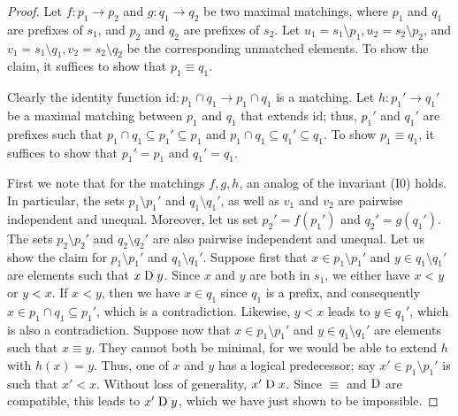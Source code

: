 \begin{proof}
  Let $f\colon p_1 \to p_2$ and $g\colon q_1 \to q_2$
  be two maximal matchings, where $p_1$ and $q_1$ are prefixes of $s_1$, and
  $p_2$ and $q_2$ are prefixes of $s_2$. Let $u_1=s_1\setminus p_1,
  u_2=s_2\setminus p_2$, and $v_1=s_1\setminus q_1, v_2=s_2\setminus q_2$
  be the corresponding unmatched elements.
  To show the claim, it suffices to show that $p_1 \equiv q_1$.

  Clearly the identity function $\mathrm{id}\colon p_1\cap q_1
  \to p_1\cap q_1$ is a matching. Let $h\colon p_1'\to q_1'$ be a maximal
  matching between $p_1$ and $q_1$ that extends $\mathrm{id}$; thus, $p_1'$ and
  $q_1'$ are prefixes such that $p_1\cap q_1 \subseteq p_1' \subseteq p_1$
  and $p_1\cap q_1 \subseteq q_1' \subseteq q_1$. To show
  $p_1 \equiv q_1$, it suffices to show that $p_1'=p_1$ and $q_1'=q_1$.

  First we note that for the matchings $f,g,h$, an analog of the invariant (I0)
  holds. In particular, the sets $p_1\setminus p_1'$ and $q_1\setminus q_1'$,
  as well as $v_1$ and $v_2$ are pairwise independent
  and unequal. Moreover, let us set $p_2'=f(p_1')$ and $q_2'=g(q_1')$.
  The sets $p_2\setminus p_2'$ and $q_2\setminus q_2'$ are also pairwise
  independent and unequal. Let us show the claim for $p_1\setminus p_1'$ and $q_1\setminus q_1'$. Suppose first that $x\in p_1\setminus p_1'$ and $y\in q_1\setminus
  q_1'$ are elements such that $x\mathrel{\mathrm{D}} y$. Since $x$ and $y$ are both in
  $s_1$, we either have $x<y$ or $y<x$. If $x<y$, then
  we have $x\in q_1$ since $q_1$ is a prefix, and consequently $x\in p_1\cap q_1\subseteq
  p_1'$, which is a contradiction. Likewise, $y<x$ leads to $y\in q_1'$, which is also a contradiction. Suppose now that $x\in p_1\setminus p_1'$ and $y\in q_1\setminus
  q_1'$ are elements such that $x\equiv y$.
  They cannot both be minimal,
  for we would be able to extend $h$ with
  $h(x)=y$. Thus, one of $x$ and $y$ has a logical predecessor; say $x'\in p_1\setminus p_1'$ is such that $x'<x$. Without loss of generality, $x' \mathrel{\mathrm{D}} x$. Since
  $\equiv$ and $\mathrel{\mathrm{D}}$ are compatible, this leads to $x' \mathrel{\mathrm{D}} y$, which we
  have just shown to be impossible.


\end{proof}
